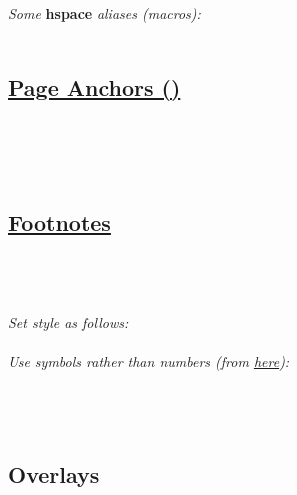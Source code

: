 \textit{Some }\textbf{hspace}\textit{ aliases (macros):}\\
\\


\subsection*{\href{https://tex.stackexchange.com/questions/2193/how-to-reference-the-page-of-a-figure}{Page Anchors ()}}

\\
\\
\\


\subsection*{\href{https://www.overleaf.com/learn/latex/Footnotes}{Footnotes}}


\\
\\
\\
\textit{Set style as follows:}\\
\\

\textit{Use symbols rather than numbers (from \href{https://tex.stackexchange.com/questions/826/symbols-instead-of-numbers-as-footnote-markers}{here}):}\\
\href{http://mirrors.ctan.org/macros/latex/contrib/footmisc/footmisc.pdf}{}\\
\\
\\

\subsection*{Overlays}
